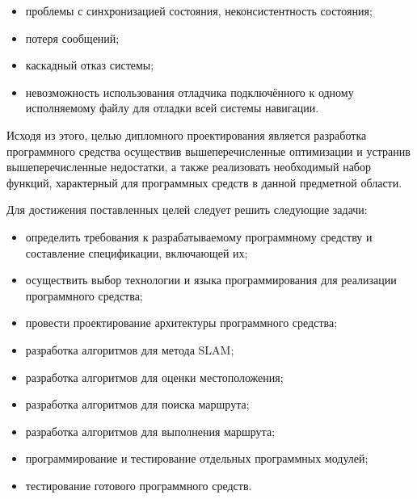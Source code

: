 \begin{itemize}
	\item проблемы с синхронизацией состояния, неконсистентность состояния;
	\item потеря сообщений;
	\item каскадный отказ системы;
	\item невозможность использования отладчика подключённого к одному
		исполняемому файлу для отладки всей системы навигации.
\end{itemize}

Исходя из этого, целью дипломного проектирования является разработка
программного средства осуществив вышеперечисленные оптимизации и устранив
вышеперечисленные недостатки, а также
реализовать необходимый набор функций, характерный для программных средств в
данной предметной области.

Для достижения поставленных целей следует решить следующие задачи: 
\begin{itemize}
	\item определить требования  к  разрабатываемому  программному  средству  и 
	составление спецификации, включающей их; 
	\item осуществить выбор  технологии  и  языка  программирования  для
		реализации программного средства; 
	\item провести проектирование архитектуры программного средства; 
	\item разработка алгоритмов для метода SLAM; 
	\item разработка алгоритмов для оценки местоположения; 
	\item разработка алгоритмов для поиска маршрута; 
	\item разработка алгоритмов для выполнения маршрута; 
	\item программирование и тестирование отдельных программных модулей; 
	\item тестирование готового программного средств.
\end{itemize}

